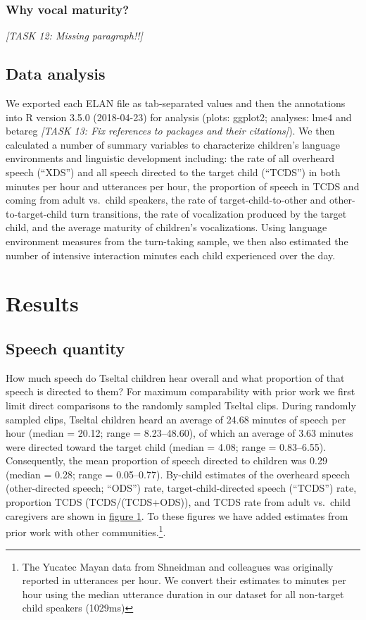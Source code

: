 \documentclass[floatsintext,man]{apa6}
\theoremstyle{definition}
\theoremstyle{definition}
\theoremstyle{definition}
\theoremstyle{remark}
\begin{document}
\subsubsection{Why vocal maturity?}\label{why-vocal-maturity}

\emph{{[}TASK 12: Missing paragraph!!{]}}

\subsection{Data analysis}\label{methods-analysisinfo}

We exported each ELAN file as tab-separated values and then the
annotations into R version 3.5.0 (2018-04-23) for analysis (plots:
ggplot2; analyses: lme4 and betareg \emph{{[}TASK 13: Fix references to
packages and their citations{]}}). We then calculated a number of
summary variables to characterize children's language environments and
linguistic development including: the rate of all overheard speech
(\enquote{XDS}) and all speech directed to the target child
(\enquote{TCDS}) in both minutes per hour and utterances per hour, the
proportion of speech in TCDS and coming from adult vs.~child speakers,
the rate of target-child-to-other and other-to-target-child turn
transitions, the rate of vocalization produced by the target child, and
the average maturity of children's vocalizations. Using language
environment measures from the turn-taking sample, we then also estimated
the number of intensive interaction minutes each child experienced over
the day.

\section{Results}\label{results}

\subsection{Speech quantity}\label{speech-quantity}

How much speech do Tseltal children hear overall and what proportion of
that speech is directed to them? For maximum comparability with prior
work we first limit direct comparisons to the randomly sampled Tseltal
clips. During randomly sampled clips, Tseltal children heard an average
of 24.68 minutes of speech per hour (median = 20.12; range =
8.23--48.60), of which an average of 3.63 minutes were directed toward
the target child (median = 4.08; range = 0.83--6.55). Consequently, the
mean proportion of speech directed to children was 0.29 (median = 0.28;
range = 0.05--0.77). By-child estimates of the overheard speech
(other-directed speech; \enquote{ODS}) rate, target-child-directed
speech (\enquote{TCDS}) rate, proportion TCDS (TCDS/(TCDS+ODS)), and
TCDS rate from adult vs.~child caregivers are shown in
\protect\hyperlink{fig1}{figure 1}. To these figures we have added
estimates from prior work with other
communities.\footnote{The Yucatec Mayan data from Shneidman and colleagues was originally reported in utterances per hour. We convert their estimates to minutes per hour using the median utterance duration in our dataset for all non-target child speakers (1029ms)}.
\end{document}
